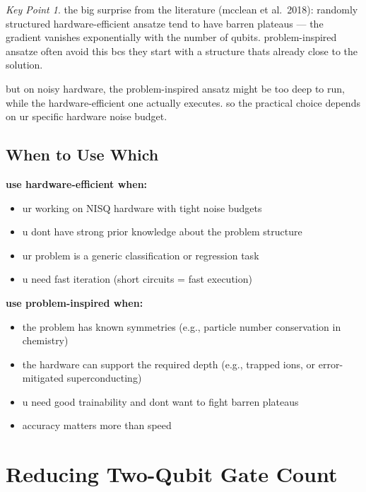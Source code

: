 \documentclass[11pt,a4paper]{article}
\theoremstyle{definition}
\theoremstyle{remark}
\newtheorem*{keypoint}{Key Point}
\begin{document}
\begin{keypoint}
the big surprise from the literature (mcclean et al.\ 2018): randomly structured hardware-efficient ansatze tend to have barren plateaus --- the gradient vanishes exponentially with the number of qubits. problem-inspired ansatze often avoid this bcs they start with a structure thats already close to the solution.

but on noisy hardware, the problem-inspired ansatz might be too deep to run, while the hardware-efficient one actually executes. so the practical choice depends on ur specific hardware noise budget.
\end{keypoint}

\subsection{When to Use Which}

\textbf{use hardware-efficient when:}
\begin{itemize}[leftmargin=*]
    \item ur working on NISQ hardware with tight noise budgets
    \item u dont have strong prior knowledge about the problem structure
    \item ur problem is a generic classification or regression task
    \item u need fast iteration (short circuits = fast execution)
\end{itemize}

\textbf{use problem-inspired when:}
\begin{itemize}[leftmargin=*]
    \item the problem has known symmetries (e.g., particle number conservation in chemistry)
    \item the hardware can support the required depth (e.g., trapped ions, or error-mitigated superconducting)
    \item u need good trainability and dont want to fight barren plateaus
    \item accuracy matters more than speed
\end{itemize}

\section{Reducing Two-Qubit Gate Count}
\end{document}
